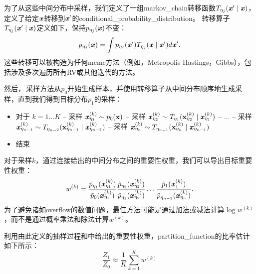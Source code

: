 为了从这些中间分布中采样，我们定义了一组\gls{markov_chain}转移函数$T_{\eta_j}(\boldsymbol{\mathit{x}}' \mid \boldsymbol{\mathit{x}})$，定义了给定$\boldsymbol{\mathit{x}}$转移到$\boldsymbol{\mathit{x}}'$的\gls{conditional_probability_distribution}。
转移算子$T_{\eta_j}(\boldsymbol{\mathit{x}}' \mid \boldsymbol{\mathit{x}})$定义如下，保持$p_{\eta_j}(\boldsymbol{\mathit{x}})$不变：
\begin{equation}
	p_{\eta_j}(\boldsymbol{\mathit{x}}) = \int p_{\eta_j} (\boldsymbol{\mathit{x}}') T_{\eta_j} (\boldsymbol{\mathit{x}} \mid \boldsymbol{\mathit{x}}') d\boldsymbol{\mathit{x}}'.
\end{equation}
这些转移可以被构造为任何\gls{mcmc}方法（例如，Metropolis-Hastings，Gibbs），包括涉及多次遍历所有\gls{RV}或其他迭代的方法。


然后，\,采样方法从$p_0$开始生成样本，并使用转移算子从中间分布顺序地生成采样，直到我们得到目标分布$p_1$的采样：
\begin{itemize}
	\item 对于 $k=1 \dots K$ 
		\newline
		\quad\quad -- 采样 $ \boldsymbol{\mathit{x}}_{\eta_1}^{(k)} \sim p_0(\mathbf{x}) $
		\newline
		\quad\quad -- 采样 $ \boldsymbol{\mathit{x}}_{\eta_2}^{(k)} \sim T_{\eta_1}(\mathbf{x}_{\eta_2}^{(k)} \mid \boldsymbol{\mathit{x}}_{\eta_1}^{(k)} ) $
		\newline
		\quad\quad -- $\dots$
		\newline
		\quad\quad -- 采样 $ \boldsymbol{\mathit{x}}_{\eta_{n-1}}^{(k)} \sim T_{\eta_{n-2}}(\mathbf{x}_{\eta_{n-1}}^{(k)} \mid \boldsymbol{\mathit{x}}_{\eta_{n-2}}^{(k)} ) $
		\newline
		\quad\quad -- 采样 $ \boldsymbol{\mathit{x}}_{\eta_n}^{(k)} \sim T_{\eta_{n-1}}(\mathbf{x}_{\eta_n}^{(k)} \mid \boldsymbol{\mathit{x}}_{\eta_{n-1}}^{(k)} ) $
	\item 结束
\end{itemize}


对于采样$k$，通过连接给出的中间分布之间的重要性权重，我们可以导出目标重要性权重：
\begin{equation}
\label{eq:18.52}
	w^{(k)} = \frac{ \tilde{p}_{\eta_1} ( \boldsymbol{\mathit{x}}_{\eta_1}^{(k)} )  }{  \tilde{p}_{0} ( \boldsymbol{\mathit{x}}_{\eta_1}^{(k)} )  }
\frac{ \tilde{p}_{\eta_2} ( \boldsymbol{\mathit{x}}_{\eta_2}^{(k)} )  }{  \tilde{p}_{\eta_1} ( \boldsymbol{\mathit{x}}_{\eta_2}^{(k)} )  }
\dots
\frac{ \tilde{p}_{1} ( \boldsymbol{\mathit{x}}_{1}^{(k)} )  }{  \tilde{p}_{\eta_{n-1}} ( \boldsymbol{\mathit{x}}_{\eta_n}^{(k)} )  } .
\end{equation}
为了避免诸如\gls{overflow}的数值问题，最佳方法可能是通过加法或减法计算$\log w^{(k)}$，而不是通过概率乘法和除法计算$w^{(k)}$。


利用由此定义的抽样过程和中给出的重要性权重，\gls{partition_function}的比率估计如下所示：
\begin{equation}
	\frac{Z_1}{Z_0} \approx \frac{1}{K} \sum_{k=1}^K w^{(k)}
\end{equation}


